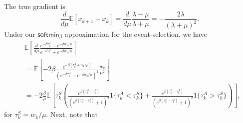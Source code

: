 The true gradient is
\[
\frac{d}{d\mu}\mathbb{E}[x_{k+1}-x_{k}]=\frac{d}{d\mu}\frac{\lambda-\mu}{\lambda+\mu}=-\frac{2\lambda}{(\lambda+\mu)^{2}}.
\]
Under our $\mathsf{softmin}_{\beta}$ approximation for the event-selection, 
we have
\begin{align*}
 & \mathbb{E}\left[\frac{d}{d\mu}\frac{e^{-\beta \tau_k^A}-e^{-\beta w_k/\mu}}{e^{-\beta \tau_k^A}+e^{-\beta w_k/\mu}}\right]\\
 & =\mathbb{E}\left[-2\beta\frac{e^{-\beta(\tau_k^A+w_k/\mu)}}{(e^{-\beta \tau_k^A}+e^{-\beta w_k/\mu})^{2}}\frac{w_k}{\mu^{2}}\right]\\
 & =-2\frac{\beta}{\mu}\mathbb{E}\left[\tau_k^S\left(\frac{e^{\beta(\tau_k^A-\tau_k^S)}}{(e^{\beta(\tau_k^A-\tau_k^S)}+1)^{2}}1\{\tau_k^A<\tau_k^S\}+\frac{e^{\beta(\tau_k^S-\tau_k^A)}}{(e^{\beta(\tau_k^S-\tau_k^A)}+1)^{2}}1\{\tau_k^A>\tau_k^S\}\right)\right],
\end{align*}
for $\tau_k^S=w_k/\mu$.
%
%
Next, note that
